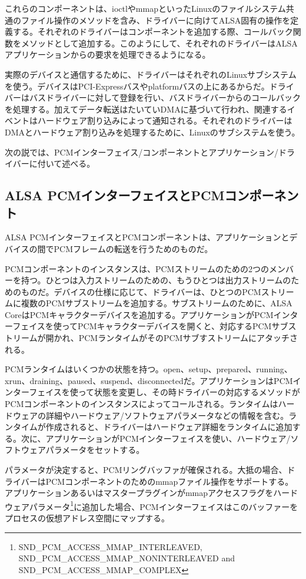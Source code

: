 \documentclass[onecolumn]{jarticle}
\begin{document}
これらのコンポーネントは、ioctlやmmapといったLinuxのファイルシステム共通のファイル操作のメソッドを含み、ドライバーに向けてALSA固有の操作を定義する。それぞれのドライバーはコンポーネントを追加する際、コールバック関数をメソッドとして追加する。このようにして、それぞれのドライバーはALSAアプリケーションからの要求を処理できるようになる。

実際のデバイスと通信するために、ドライバーはそれぞれのLinuxサブシステムを使う。デバイスはPCI-Expressバスやplatformバスの上にあるからだ。ドライバーはバスドライバーに対して登録を行い、バスドライバーからのコールバックを処理する。加えてデータ転送はたいていDMAに基づいて行われ、関連するイベントはハードウェア割り込みによって通知される。それぞれのドライバーはDMAとハードウェア割り込みを処理するために、Linuxのサブシステムを使う。

次の説では、PCMインターフェイス/コンポーネントとアプリケーション/ドライバーに付いて述べる。


\subsection{ALSA PCMインターフェイスとPCMコンポーネント}
\label{sec:alsa-pcm}

ALSA PCMインターフェイスとPCMコンポーネントは、アプリケーションとデバイスの間でPCMフレームの転送を行うためのものだ。

PCMコンポーネントのインスタンスは、PCMストリームのための2つのメンバーを持つ。ひとつは入力ストリームのための、もうひとつは出力ストリームのためのものだ。デバイスの仕様に応じて、ドライバーは、ひとつのPCMストリームに複数のPCMサブストリームを追加する。サブストリームのために、ALSA CoreはPCMキャラクターデバイスを追加する。アプリケーションがPCMインターフェイスを使ってPCMキャラクターデバイスを開くと、対応するPCMサブストリームが開かれ、PCMランタイムがそのPCMサブすストリームにアタッチされる。

PCMランタイムはいくつかの状態を持つ。open、setup、prepared、running、xrun、draining、paused、suspend、disconnectedだ\cite{alsa-lib}。アプリケーションはPCMインターフェイスを使って状態を変更し、その時ドライバーの対応するメソッドがPCMコンポーネントのインスタンスによってコールされる。ランタイムはハードウェアの詳細やハードウェア/ソフトウェアパラメータなどの情報を含む。ランタイムが作成されると、ドライバーはハードウェア詳細をランタイムに追加する。次に、アプリケーションがPCMインターフェイスを使い、ハードウェア/ソフトウェアパラメータをセットする。

パラメータが決定すると、PCMリングバッファが確保される。大抵の場合、ドライバーはPCMコンポーネントのためのmmapファイル操作をサポートする。アプリケーションあるいはマスタープラグインがmmapアクセスフラグをハードウェアパラメータ\footnote{SND\_PCM\_ACCESS\_MMAP\_INTERLEAVED, SND\_PCM\_ACCESS\_MMAP\_NONINTERLEAVED and SND\_PCM\_ACCESS\_MMAP\_COMPLEX}に追加した場合、PCMインターフェイスはこのバッファーをプロセスの仮想アドレス空間にマップする。
\end{document}
